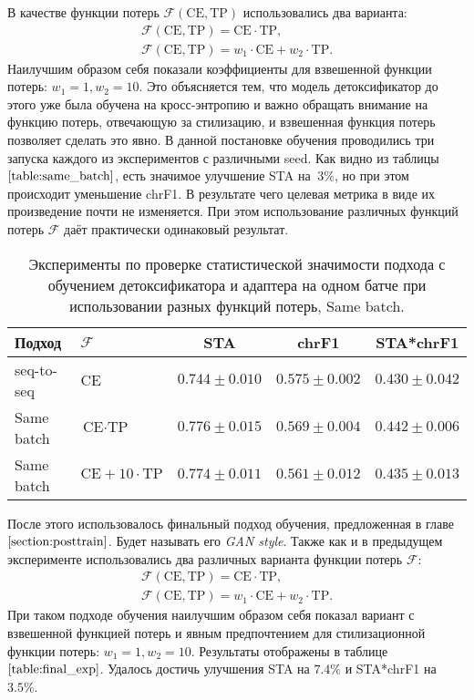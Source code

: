 В качестве функции потерь $\mathcal{F}(\text{CE}, \text{TP})$ использовались два варианта: 
\begin{gather*}
    \mathcal{F}(\text{CE}, \text{TP}) = \text{CE} \cdot \text{TP}, \\
    \mathcal{F}(\text{CE}, \text{TP}) = w_{1} \cdot \text{CE} + w_{2} \cdot \text{TP}. 
\end{gather*}
Наилучшим образом себя показали коэффициенты для взвешенной функции потерь: $w_1= 1, w_2 = 10$. Это объясняется тем, что модель детоксификатор до этого уже была обучена на кросс-энтропию и важно обращать внимание на функцию потерь, отвечающую за стилизацию, и взвешенная функция потерь позволяет сделать это явно.
В данной постановке обучения проводились три запуска каждого из экспериментов с различными seed.
Как видно из таблицы $\ref{table:same_batch}$, есть значимое улучшение STA на $~3\%$, но при этом происходит уменьшение chrF1. 
В результате чего целевая метрика в виде их произведение почти не изменяется.
При этом использование различных функций потерь $\mathcal{F}$ даёт практически одинаковый результат.   
\begin{table}[ht]
\centering
 \begin{tabular}{|l l|c c c|} 
 \hline
 Подход & $\mathcal{F}$ & STA & chrF1 & STA*chrF1 \\ [0.5ex] 
 \hline
 seq-to-seq & CE & $0.744 \pm 0.010$ & $0.575 \pm 0.002$ & $0.430 \pm 0.042$ \\ 
 Same batch & $\text{CE} \cdot \text{TP}$ & $0.776 \pm 0.015$ & $0.569 \pm 0.004$ & $0.442 \pm 0.006$ \\
 Same batch & $\text{CE} + 10 \cdot \text{TP}$ & $0.774 \pm 0.011$ & $0.561 \pm 0.012$ & $0.435 \pm 0.013$ \\
  \hline
 \end{tabular}
\caption{Эксперименты по проверке статистической значимости подхода с обучением детоксификатора и адаптера на одном батче при использовании разных функций потерь, Same batch.}
\label{table:same_batch}
\end{table}

После этого использовалось финальный подход обучения, предложенная в главе $\ref{section:posttrain}$.
Будет называть его \textit{GAN style}.
Также как и в предыдущем эксперименте использовались два различных варианта функции потерь $\mathcal{F}$:
\begin{gather*}
    \mathcal{F}(\text{CE}, \text{TP}) = \text{CE} \cdot \text{TP}, \\
    \mathcal{F}(\text{CE}, \text{TP}) = w_{1} \cdot \text{CE} + w_{2} \cdot \text{TP}. 
\end{gather*}
При таком подходе обучения наилучшим образом себя показал вариант с взвешенной функцией потерь и явным предпочтением для стилизационной функции потерь: $w_{1} = 1, w_{2} = 10$. 
Результаты отображены в таблице $\ref{table:final_exp}$.
Удалось достичь улучшения STA на $7.4\%$ и STA*chrF1 на $3.5\%$.

